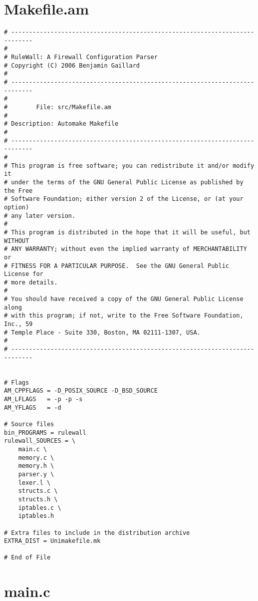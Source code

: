 \documentclass[a4paper,landscape,twocolumn,11pt]{article}
\begin{document}


\section*{Makefile.am}

{\tiny\begin{verbatim}
# ----------------------------------------------------------------------------
#
# RuleWall: A Firewall Configuration Parser
# Copyright (C) 2006 Benjamin Gaillard
#
# ----------------------------------------------------------------------------
#
#        File: src/Makefile.am
#
# Description: Automake Makefile
#
# ----------------------------------------------------------------------------
#
# This program is free software; you can redistribute it and/or modify it
# under the terms of the GNU General Public License as published by the Free
# Software Foundation; either version 2 of the License, or (at your option)
# any later version.
#
# This program is distributed in the hope that it will be useful, but WITHOUT
# ANY WARRANTY; without even the implied warranty of MERCHANTABILITY or
# FITNESS FOR A PARTICULAR PURPOSE.  See the GNU General Public License for
# more details.
#
# You should have received a copy of the GNU General Public License along
# with this program; if not, write to the Free Software Foundation, Inc., 59
# Temple Place - Suite 330, Boston, MA 02111-1307, USA.
#
# ----------------------------------------------------------------------------


# Flags
AM_CPPFLAGS = -D_POSIX_SOURCE -D_BSD_SOURCE
AM_LFLAGS   = -p -p -s
AM_YFLAGS   = -d

# Source files
bin_PROGRAMS = rulewall
rulewall_SOURCES = \
    main.c \
    memory.c \
    memory.h \
    parser.y \
    lexer.l \
    structs.c \
    structs.h \
    iptables.c \
    iptables.h

# Extra files to include in the distribution archive
EXTRA_DIST = Unimakefile.mk

# End of File
\end{verbatim}}

\bigskip\section*{main.c}
\end{document}

